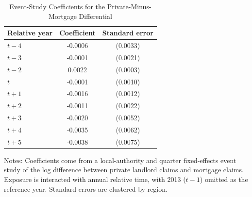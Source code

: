 \begin{table}[H]
\centering
\caption{Event-Study Coefficients for the Private-Minus-Mortgage Differential}
\begin{threeparttable}
\begin{tabular}{lcc}
\toprule
Relative year & Coefficient & Standard error \\
\midrule
$t-4$ & -0.0006 & (0.0033) \\
$t-3$ & -0.0001 & (0.0021) \\
$t-2$ & 0.0022\sym{***} & (0.0003) \\
$t$ & -0.0001 & (0.0010) \\
$t+1$ & -0.0016 & (0.0012) \\
$t+2$ & -0.0011 & (0.0022) \\
$t+3$ & -0.0020 & (0.0052) \\
$t+4$ & -0.0035 & (0.0062) \\
$t+5$ & -0.0038 & (0.0075) \\
\bottomrule
\end{tabular}
\begin{flushleft}
\small Notes: Coefficients come from a local-authority and quarter fixed-effects event study of the log difference between private landlord claims and mortgage claims. Exposure is interacted with annual relative time, with 2013 ($t-1$) omitted as the reference year. Standard errors are clustered by region.
\end{flushleft}
\end{threeparttable}
\label{tab:eventstudy}
\end{table}
